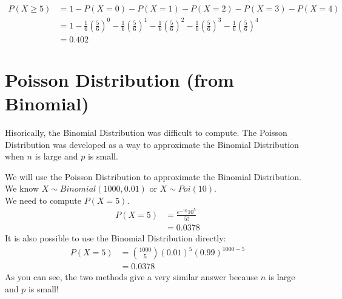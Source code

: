 \documentclass{report}
\begin{document}
\begin{align*}
	P(X \geq 5) &= 1 - P(X = 0) - P(X = 1) - P(X = 2) - P(X = 3) - P(X = 4)\\
		    &= 1 - \frac{1}{6}\left(\frac{5}{6}\right)^0 - \frac{1}{6}\left(\frac{5}{6}\right)^1 - \frac{1}{6}\left(\frac{5}{6}\right)^2 - \frac{1}{6}\left(\frac{5}{6}\right)^3 - \frac{1}{6}\left(\frac{5}{6}\right)^4\\
		    &= 0.402
\end{align*}

\section{Poisson Distribution (from Binomial)}
Hisorically, the Binomial Distribution was difficult to compute. The Poisson Distribution was developed as a way to approximate the Binomial Distribution when $n$ is large and $p$ is small.


\sol We will use the Poisson Distribution to approximate the Binomial Distribution.
\\ We know $X \sim Binomial(1000, 0.01)$ or $X \sim Poi(10)$.
\\ We need to compute $P(X = 5)$.
\\ \begin{align*}
	P(X = 5) &= \frac{e^{-10} 10^5}{5!}\\
		 &= 0.0378
\end{align*}
It is also possible to use the Binomial Distribution directly:
\\ \begin{align*}
	P(X = 5) &= \binom{1000}{5} \left(0.01\right)^5 \left(0.99\right)^{1000-5}\\
		 &= 0.0378
\end{align*}
As you can see, the two methods give a very similar answer because $n$ is large and $p$ is small!
\end{document}
